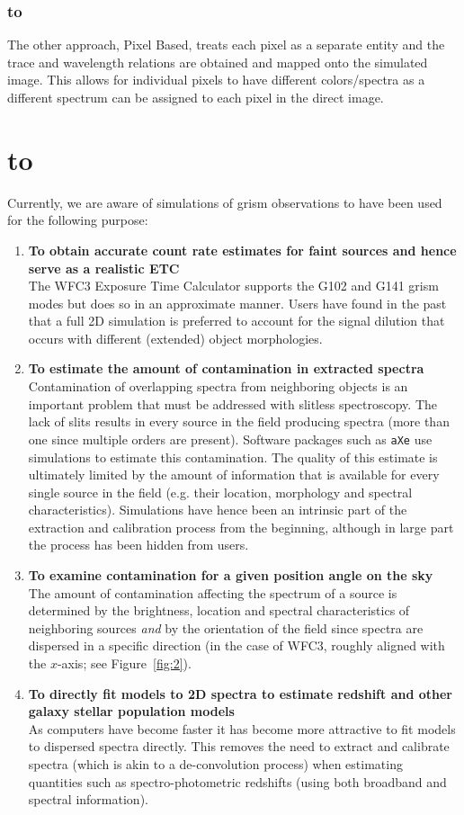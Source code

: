 \documentclass[12pt]{article}
\def\ssection#1{\section{\hbox to \hsize{\large\bf #1\hfill}}}
\def\ssubsubsection#1{\subsubsection{\hbox to \hsize{#1\hfill}}}
\begin{document}
\ssubsubsection{Pixel based}

The other approach, Pixel Based, treats each pixel as a separate entity and the trace and wavelength relations are obtained and mapped onto the simulated image. This allows for individual pixels to have different colors/spectra as a different spectrum can be assigned to each pixel in the direct image. 

\ssection{Use of Simulations}
Currently, we are aware of simulations of grism observations to have been used for the following purpose:

\begin{enumerate}
\item {\bf To obtain accurate count rate estimates for faint sources and hence serve as a realistic ETC} \\
The WFC3 Exposure Time Calculator supports the G102 and G141 grism modes but does so in an approximate manner. Users have found in the past that a full 2D simulation is preferred to account for the signal dilution that occurs with different (extended) object morphologies.  

\item {\bf To estimate the amount of contamination in extracted spectra} \\
Contamination of overlapping spectra from neighboring objects is an important problem that must be addressed with slitless spectroscopy. The lack of slits results in every source in the field producing spectra (more than one since multiple orders are present). Software packages such as \texttt{aXe} use simulations to estimate this contamination. The quality of this estimate is ultimately limited by the amount of information that is available for every single source in the field (e.g. their location, morphology and spectral characteristics). Simulations have hence been an intrinsic part of the extraction and calibration process from the beginning, although in large part the process has been hidden from users.

\item {\bf To examine contamination for a given position angle on the sky} \\
The amount of contamination affecting the spectrum of a source is determined by the brightness, location and spectral characteristics of neighboring sources {\em and} by the orientation of the field since spectra are dispersed in a specific direction (in the case of WFC3, roughly aligned with the $x$-axis; see Figure~\ref{fig:2}).

\item {\bf To directly fit models to 2D spectra to estimate redshift and other galaxy stellar population models} \\
As computers have become faster it has become more attractive to fit models to dispersed spectra directly. This removes the need to extract and calibrate spectra (which is akin to a de-convolution process) when estimating quantities such as spectro-photometric redshifts (using both broadband and spectral information).

\end{enumerate}
\end{document}
